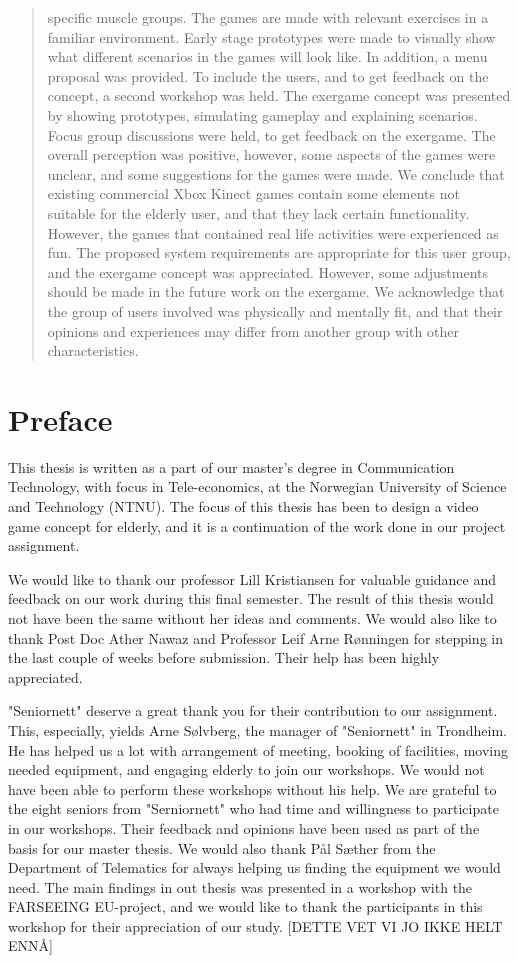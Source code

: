 \documentclass[b5paper,twoside,openright,11pt]{report}
\begin{document}
\begin{abstract}
specific muscle groups. The games are made with relevant exercises in a familiar environment. Early stage prototypes were made to visually show what different scenarios in the games will look like. In addition, a menu proposal was provided. To include the users, and to get feedback on the concept, a second workshop was held. The exergame concept was presented by showing prototypes, simulating gameplay and explaining scenarios. Focus group discussions were held, to get feedback on the exergame. The overall perception was positive, however, some aspects of the games were unclear, and some suggestions for the games were made. We conclude that existing commercial Xbox Kinect games contain some elements not suitable for the elderly user, and that they lack certain functionality. However, the games that contained real life activities were experienced as fun. The proposed system requirements are appropriate for this user group, and the exergame concept was appreciated. However, some adjustments should be made in the future work on the exergame. We acknowledge that the group of users involved was physically and mentally fit, and that their opinions and experiences may differ from another group with other characteristics.




\end{abstract}
\cleardoublepage
\chapter*{Preface}
This thesis is written as a part of our master's degree in Communication Technology, with focus in Tele-economics, at the Norwegian University of Science and Technology (NTNU). The focus of this thesis has been to design a video game concept for elderly, and it is a continuation of the work done in our project assignment. 

We would like to thank our professor Lill Kristiansen for valuable guidance and feedback on our work during this final semester. The result of this thesis would not have been the same without her ideas and comments. We would also like to thank Post Doc Ather Nawaz and Professor Leif Arne Rønningen for stepping in the last couple of weeks before submission. Their help has been highly appreciated.  

"Seniornett" deserve a great thank you for their contribution to our assignment. This, especially, yields Arne Sølvberg, the manager of "Seniornett" in Trondheim. He has helped us a lot with arrangement of meeting, booking of facilities, moving needed equipment, and engaging elderly to join our workshops. We would not have been able to perform these workshops without his help. We are grateful to the eight seniors from "Serniornett" who had time and willingness to participate in our workshops. Their feedback and opinions have been used as part of the basis for our master thesis. We would also thank Pål Sæther from the Department of Telematics for always helping us finding the equipment we would need. The main findings in out thesis was presented in a workshop with the FARSEEING EU-project, and we would like to thank the participants in this workshop for their appreciation of our study. [DETTE VET VI JO IKKE HELT ENNÅ]       
\end{document}
